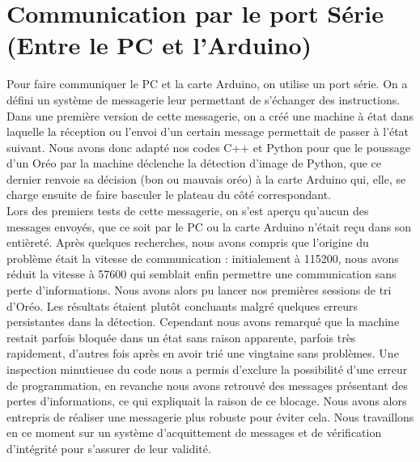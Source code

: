 \documentclass{article}
\begin{document}
\section{Communication par le port Série (Entre le PC et l'Arduino)}
Pour faire communiquer le PC et la carte Arduino, on utilise un port série. On a défini un système de messagerie leur permettant de s'échanger des instructions.
Dans une première version de cette messagerie, on a créé une machine à état dans laquelle la réception ou l'envoi d'un certain message permettait de passer à l'état suivant.
Nous avons donc adapté nos codes C++ et Python pour que le poussage d'un Oréo par la machine déclenche la détection d'image de Python, que ce dernier renvoie sa décision (bon ou mauvais oréo) à la carte Arduino qui, elle, se charge ensuite de faire basculer le plateau du côté correspondant.
\\
Lors des premiers tests de cette messagerie, on s'est aperçu qu'aucun des messages envoyés, que ce soit par le PC ou la carte Arduino n'était reçu dans son entièreté. Après quelques recherches, nous avons compris que l'origine du problème était la vitesse de communication : initialement à 115200, nous avons réduit la vitesse à 57600 qui semblait enfin permettre une communication sans perte d'informations.
Nous avons alors pu lancer nos premières sessions de tri d'Oréo. Les résultats étaient plutôt concluants malgré quelques erreurs persistantes dans la détection.
Cependant nous avons remarqué que la machine restait parfois bloquée dans un état sans raison apparente, parfois très rapidement, d'autres fois après en avoir trié une vingtaine sans problèmes. Une inspection minutieuse du code nous a permis d'exclure la possibilité d'une erreur de programmation, en revanche nous avons retrouvé des messages présentant des pertes d'informations, ce qui expliquait la raison de ce blocage.
Nous avons alors entrepris de réaliser une messagerie plus robuste pour éviter cela. Nous travaillons en ce moment sur un système d'acquittement de messages et de vérification d'intégrité pour s'assurer de leur validité.
\end{document}
